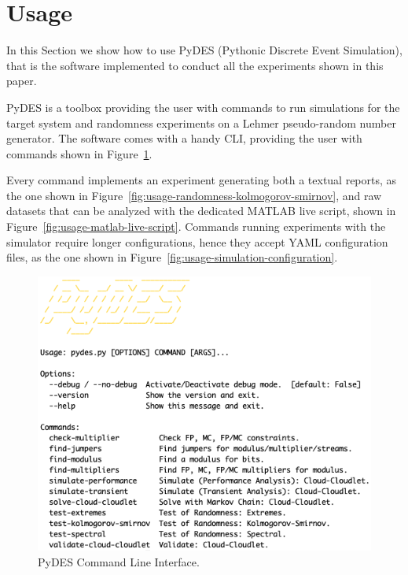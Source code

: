 \section{Usage}
\label{sec:usage}

In this Section we show how to use PyDES (Pythonic Discrete Event Simulation), that is the software implemented to conduct all the experiments shown in this paper.

PyDES is a toolbox providing the user with commands to run simulations for the target system and randomness experiments on a Lehmer pseudo-random number generator.
The software comes with a handy CLI, providing the user with commands shown in Figure~\ref{fig:usage-cli-menu}. 

Every command implements an experiment generating both a textual reports, as the one shown in Figure~\ref{fig:usage-randomness-kolmogorov-smirnov}, and raw datasets that can be analyzed with the dedicated MATLAB live script, shown in Figure~\ref{fig:usage-matlab-live-script}. 
Commands running experiments with the simulator require longer configurations, hence they accept YAML configuration files, as the one shown in Figure~\ref{fig:usage-simulation-configuration}.

\begin{figure}
	\includegraphics[width=\columnwidth]{fig/usage-pydes-cli}
	\caption{PyDES Command Line Interface.}
	\label{fig:usage-cli-menu}
\end{figure}

